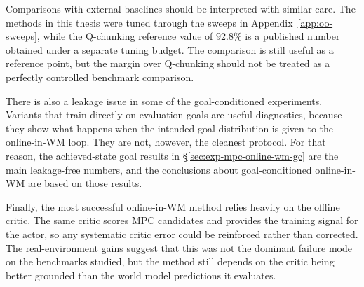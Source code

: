 Comparisons with external baselines should be interpreted with similar
care. The methods in this thesis were tuned through the sweeps in
Appendix~\ref{app:oo-sweeps}, while the Q-chunking reference value of
$92.8\%$ is a published number obtained under a separate tuning budget.
The comparison is still useful as a reference point, but the margin over
Q-chunking should not be treated as a perfectly controlled benchmark
comparison.

There is also a leakage issue in some of the goal-conditioned
experiments. Variants that train directly on evaluation goals are useful
diagnostics, because they show what happens when the intended goal
distribution is given to the online-in-WM loop. They are not, however,
the cleanest protocol. For that reason, the achieved-state goal results
in \S\ref{sec:exp-mpc-online-wm-gc} are the main leakage-free numbers,
and the conclusions about goal-conditioned online-in-WM are based on
those results.

Finally, the most successful online-in-WM method relies heavily on the
offline critic. The same critic scores MPC candidates and provides the
training signal for the actor, so any systematic critic error could be
reinforced rather than corrected. The real-environment gains suggest
that this was not the dominant failure mode on the benchmarks studied,
but the method still depends on the critic being better grounded than
the world model predictions it evaluates.
